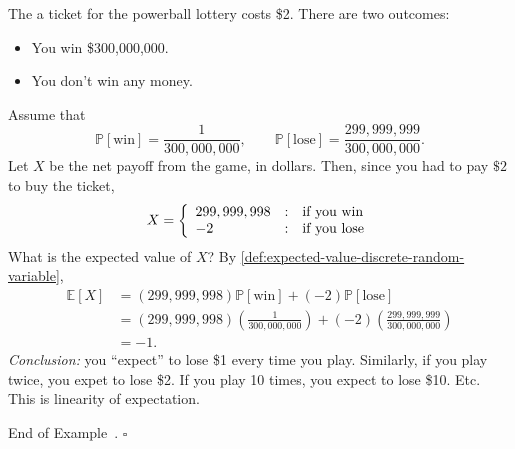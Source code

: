 \documentclass[10pt]{article}
\theoremstyle{definition}
\newtheorem{example}[theorem]{Example}
\renewenvironment{example}
{\begin{oldexample}}
  {\par\smallskip\hfill   End of Example~\theexample. $\square$    \par\end{oldexample}}
\newcommand{\1}[1]{\textbf{1}_{\left[#1\right]}} %
\def\E{\mathbb{E}} %
\def\P{\mathbb{P}} %
\begin{document}
\begin{example}[Powerball Lottery]
  \label{ex:powerball-lottery}
  The a ticket for the powerball lottery costs \$2. There are two outcomes:
  \begin{itemize}
    \item You win \$300,000,000.
    \item You don't win any money.
  \end{itemize}
  Assume that
  \begin{equation*}
    \P \left[ \text{win} \right] = \frac{1}{300,000,000},
    \qquad \P \left[ \text{lose} \right] = \frac{299,999,999}{300,000,000}. 
  \end{equation*}
  Let $X$ be the net payoff from the game, in dollars. Then, since you had to
  pay $\$2$ to buy the ticket,
  \begin{equation*}
    X = \left\{ \begin{array}{l@{\quad:\quad}l}
        299,999,998& \text{if you win}\\
        -2 & \text{if you lose}
         \end{array}\right.
  \end{equation*}
  What is the expected value of $X$? By \cref{def:expected-value-discrete-random-variable},
  \begin{align*}
    \E\left[X \right]
    &=(299,999,998)\P\left[\text{win} \right]+(-2)\P\left[ \text{lose}\right]\\
    &=(299,999,998)\left(\frac{1}{300,000,000}\right) + (-2)\left(\frac{299,999,999}{300,000,000}\right)\\
    &=-1.
  \end{align*}
  \textit{Conclusion:} you ``expect'' to lose \$1 every time you play.
  Similarly, if you play twice, you expet to lose \$2. If you play 10 times,
  you expect to lose \$10. Etc. This is linearity of expectation.
\end{example}
\end{document}

